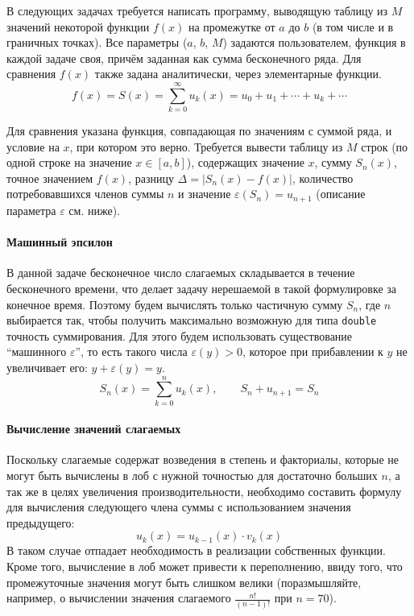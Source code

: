 
В следующих задачах требуется написать программу, выводящую таблицу из $M$
значений некоторой функции $f(x)$ на промежутке от $a$ до $b$ (в том числе и в
граничных точках). Все параметры ($a$, $b$, $M$) задаются пользователем,
функция в каждой задаче своя, причём заданная как сумма бесконечного ряда. Для
сравнения $f(x)$ также задана аналитически, через элементарные функции.
%
\[
  f(x)=S(x)=\sum_{k=0}^\infty u_k(x)=u_0+u_1+\cdots+u_k+\cdots
\]

Для сравнения указана функция, совпадающая по значениям с суммой ряда, и
условие на $x$, при котором это верно. Требуется вывести таблицу из $M$ строк
(по одной строке на значение $x \in [a,b]$), содержащих значение $x$, сумму
$S_n(x)$, точное значением $f(x)$, разницу $\Delta = |S_n(x) - f(x)|$,
количество потребовавшихся членов суммы $n$ и значение
$\varepsilon(S_n)=u_{n+1}$ (описание параметра $\varepsilon$ см. ниже).


\zzsectionCOMMENTS

\paragraph{Машинный эпсилон}
В данной задаче бесконечное число слагаемых складывается в течение бесконечного времени, что делает задачу нерешаемой в такой формулировке за конечное время. 
Поэтому будем вычислять только частичную сумму $S_n$, где $n$ выбирается так,
чтобы получить максимально возможную для типа \texttt{double} точность
суммирования. Для этого будем использовать существование ``машинного
$\varepsilon$'', то есть такого числа $\varepsilon(y) > 0$, которое при
прибавлении к $y$ не увеличивает его: $y + \varepsilon(y) = y$.
%
\[
S_n(x)=\sum_{k=0}^n u_k(x),\qquad S_n + u_{n+1} = S_n
\]

\paragraph{Вычисление значений слагаемых}
Поскольку слагаемые содержат возведения в степень и факториалы, которые не
могут быть вычислены в лоб с нужной точностью для достаточно больших $n$, а так же в целях увеличения производительности, необходимо составить формулу для вычисления следующего члена суммы с использованием значения предыдущего:
%
\[
u_k(x) = u_{k-1}(x)\cdot v_k(x)
\]
В таком случае отпадает необходимость в реализации собственных функции. Кроме того, вычисление в лоб может привести к переполнению, ввиду того, что промежуточные значения могут быть слишком велики (поразмышляйте, например, о вычислении значения слагаемого $\frac{n!}{(n-1)!}$ при $n = 70$).

